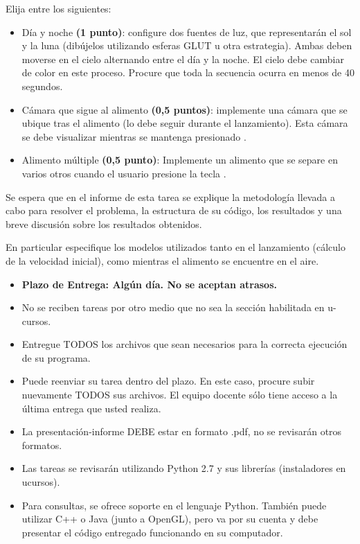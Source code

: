 \documentclass[letterpaper,11pt]{article} %
\def\plazoentrega {Algún día}
\begin{document}

Elija entre los siguientes:

\begin{itemize}
	\item Día y noche \textbf{(1 punto)}: configure dos fuentes de luz, que representarán el sol y la luna (dibújelos utilizando esferas GLUT u otra estrategia). Ambas deben moverse en el cielo alternando entre el día y la noche. El cielo debe cambiar de color en este proceso. Procure que toda la secuencia ocurra en menos de 40 segundos.
	\item Cámara que sigue al alimento \textbf{(0,5 puntos)}: implemente una cámara que se ubique tras el alimento (lo debe seguir durante el lanzamiento). Esta cámara se debe visualizar mientras se mantenga presionado .
	\item Alimento múltiple \textbf{(0,5 punto)}: Implemente un alimento que se separe en varios otros cuando el usuario presione la tecla .
\end{itemize}


Se espera que en el informe de esta tarea se explique la metodología llevada a cabo para resolver el problema, la estructura de su código, los resultados y una breve discusión sobre los resultados obtenidos. 

\newp En particular especifique los modelos utilizados tanto en el lanzamiento (cálculo de la velocidad inicial), como mientras el alimento se encuentre en el aire.


\begin{itemize}
	\item \textbf{Plazo de Entrega: \plazoentrega. No se aceptan atrasos.}
	\item No se reciben tareas por otro medio que no sea la sección habilitada en u-cursos.
	\item Entregue TODOS los archivos que sean necesarios para la correcta ejecución de su programa.
	\item Puede reenviar su tarea dentro del plazo. En este caso, procure subir nuevamente TODOS sus archivos. El equipo docente sólo tiene acceso a la última entrega que usted realiza.
	\item La presentación-informe DEBE estar en formato .pdf, no se revisarán otros formatos.
	\item Las tareas se revisarán utilizando Python 2.7 y sus librerías (instaladores en ucursos).
	\item Para consultas, se ofrece soporte en el lenguaje Python. También puede utilizar C++ o Java (junto a OpenGL), pero va por su cuenta y debe presentar el código entregado funcionando en su computador.
\end{itemize}
\end{document}
